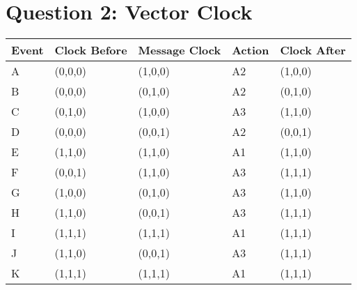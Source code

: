 \section{Question 2: Vector Clock}

\begin{tabularx}{\columnwidth}{|X|X|X|X|X|}
  \hline
  Event & Clock Before & Message Clock & Action & Clock After\\
  \hline
  A & (0,0,0) & (1,0,0) & A2 & (1,0,0)\\
  \hline
  B & (0,0,0) & (0,1,0) & A2 & (0,1,0)\\
  \hline
  C & (0,1,0) & (1,0,0) & A3 & (1,1,0)\\
  \hline
  D & (0,0,0) & (0,0,1) & A2 & (0,0,1)\\
  \hline
  E & (1,1,0) & (1,1,0) & A1 & (1,1,0)\\
  \hline
  F & (0,0,1) & (1,1,0) & A3 & (1,1,1)\\
  \hline
  G & (1,0,0) & (0,1,0) & A3 & (1,1,0)\\
  \hline
  H & (1,1,0) & (0,0,1) & A3 & (1,1,1)\\
  \hline
  I & (1,1,1) & (1,1,1) & A1 & (1,1,1)\\
  \hline
  J & (1,1,0) & (0,0,1) & A3 & (1,1,1)\\
  \hline
  K & (1,1,1) & (1,1,1) & A1 & (1,1,1)\\
  \hline
\end{tabularx}